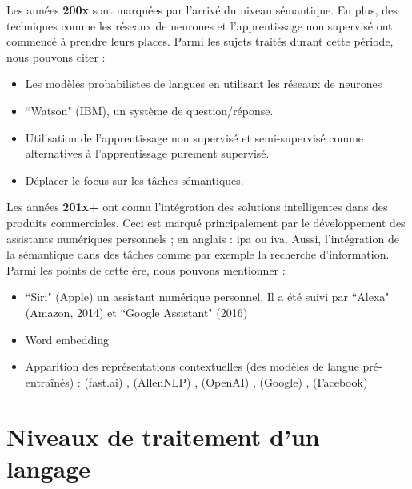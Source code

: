 \documentclass{KodeBook}
\begin{document}
Les années \textbf{200x} sont marquées par l'arrivé du niveau sémantique. 
En plus, des techniques comme les réseaux de neurones et l'apprentissage non supervisé ont commencé à prendre leurs places.
Parmi les sujets traités durant cette période, nous pouvons citer :
\begin{itemize}
	\item {} Les modèles probabilistes de langues en utilisant les réseaux de neurones \cite{2003-bengio-al}
	\item {} ``Watson" (IBM), un système de question/réponse.
	\item Utilisation de l'apprentissage non supervisé et semi-supervisé comme alternatives à l'apprentissage purement supervisé.
	\item Déplacer le focus sur les tâches sémantiques.
\end{itemize}

Les années \textbf{201x+} ont connu l'intégration des solutions intelligentes dans des produits commerciales.
Ceci est marqué principalement par le développement des assistants numériques personnels ; en anglais : \ac{ipa} ou \ac{iva}.
Aussi, l'intégration de la sémantique dans des tâches comme par exemple la recherche d'information. 
Parmi les points de cette ère, nous pouvons mentionner :
\begin{itemize}
	\item {} ``Siri" (Apple)  un assistant numérique personnel. Il a été suivi par ``Alexa" (Amazon, 2014) et ``Google Assistant" (2016)
	\item {} Word embedding \cite{2014-lebret-collobert}
	\item {} Apparition des représentations contextuelles (des modèles de langue pré-entraînés) :  (fast.ai) \cite{2018-howard-ruder},  (AllenNLP) \cite{2018-peters-al},  (OpenAI) \cite{2018-radford-al},  (Google) \cite{2018-devlin-al},  (Facebook) \cite{2019-lample-conneau}
\end{itemize}

\section{Niveaux de traitement d'un langage}
\end{document}
